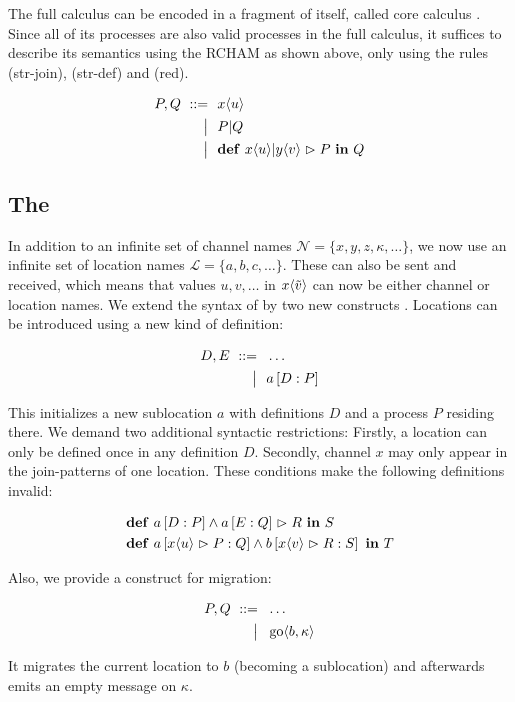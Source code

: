The full calculus can be encoded in a fragment of itself, called core calculus
\cite{fournet_reflexive_1996}.
Since all of its processes are also valid processes in the full calculus,
it suffices to describe its semantics using the RCHAM as shown above,
only using the rules (str-join), (str-def) and (red).

\begin{align*}
  P, Q
  \ ::=&\ \  x\langle u\rangle
  \\ \big|&\ \  P | Q
  \\ \big|&\ \  \textbf{\textup{def}} \ x\langle u\rangle | y\langle v\rangle \vartriangleright P \ \textbf{\textup{in}} \ Q
\end{align*}


\subsection{The \DistJoinCalc}

In addition to an infinite set of channel names
$ \mathcal{N} = \{ x, y, z, \kappa, \ldots \} $,
we now use an infinite set of location names
$ \mathcal{L} = \{ a, b, c, \ldots \} $.
These can also be sent and received, which means that values
$ u, v, \ldots $ in $ x\langle\tilde{v}\rangle $
can now be either channel or location names.
We extend the syntax of \joincalc by two new constructs
\cite{fournet_calculus_1996}.
Locations can be introduced using a new kind of definition:

\begin{align*}
  D, E
  \ ::=&\ \  \dots
  \\ \big|&\ \  a \left[ D : P \right]
\end{align*}

This initializes a new sublocation $a$ with definitions $D$
and a process $P$ residing there.
We demand two additional syntactic restrictions:
Firstly, a location can only be defined once in any definition $D$.
Secondly, channel $x$ may only appear in the join-patterns of one location.
These conditions make the following definitions invalid:

\begin{align*}
  &\textbf{\textup{def}} \ a \left[ D : P \right] \wedge a \left[ E : Q \right] \vartriangleright R \ \textbf{\textup{in}} \ S
  \\
  &\textbf{\textup{def}} \ a \left[ x\langle u\rangle \vartriangleright P : Q \right]
     \wedge
     b \left[ x\langle v\rangle \vartriangleright R : S \right]
      \ \textbf{\textup{in}} \ T
\end{align*}

Also, we provide a construct for migration:

\begin{align*}
  P, Q
  \ ::=&\ \  \dots
  \\ \big|&\ \  \operatorname{go} \langle b, \kappa \rangle
\end{align*}

It migrates the current location to $b$ (becoming a sublocation)
and afterwards emits an empty message on $\kappa$.

